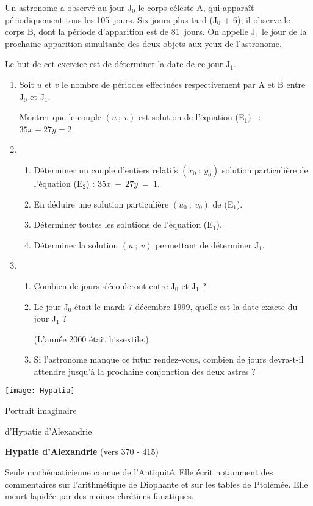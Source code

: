\begin{TP}

Un astronome a observé au jour J$_0$ le corps céleste A, qui apparaît périodiquement tous les 105~jours. Six jours plus tard (J$_0$ + 6), il observe le corps B, dont la période d'apparition est de 81~jours. On appelle J$_1$ le jour de la prochaine apparition simultanée des deux objets aux yeux de  l'astronome.
 
Le but de cet exercice est de déterminer la date de ce jour  J$_1$.\vspace{-5pt}
 
\begin{enumerate}
\item Soit $u$ et $v$ le nombre de périodes effectuées respectivement
  par A et B entre J$_0$ et J$_1$. 

Montrer que le couple $(u~;~ v)$ est solution de l'équation (E$_1)$~ : \enskip $35x - 27y = 2$.\medskip
\item 
  \begin{enumerate}
  \item Déterminer un couple d'entiers relatifs $(x_0\ ;\ y_0)$
    solution particulière de l'équation (E$_2$) :\enskip
    $35x~-~27y~=~1$.

  \item En déduire une solution particulière $(u_0~;~v_0)$ de (E$_1$).
  \item Déterminer toutes les solutions de l'équation (E$_1$).
  \item Déterminer la solution $(u~;~v)$ permettant de déterminer
    J$_1$.
  \end{enumerate}
\item 
  \begin{enumerate}
  \item Combien de jours s'écouleront entre J$_0$ et J$_1$ ?
  \item Le jour J$_0$ était le mardi 7 décembre 1999, quelle est la
    date exacte du jour J$_1$ ?

    (L'année 2000 était bissextile.)
  \item Si l'astronome manque ce futur rendez-vous, combien de jours
    devra-t-il attendre jusqu'à la prochaine conjonction des deux
    astres ?
  \end{enumerate}
\end{enumerate}

\parbox{0.15\textwidth}{\texttt{[image: Hypatia]}

{\scriptsize Portrait imaginaire\par d'Hypatie d'Alexandrie\par}
}
\parbox{0.77\textwidth}{\begin{minipage}{0.65\textwidth}
\textbf{Hypatie d'Alexandrie} (vers 370 - 415)

Seule mathématicienne connue de l'Antiquité. Elle écrit notamment des commentaires sur l'arithmétique de Diophante et sur les tables de Ptolémée.
Elle meurt lapidée par des moines chrétiens fanatiques.
\end{minipage}}
\end{TP}

